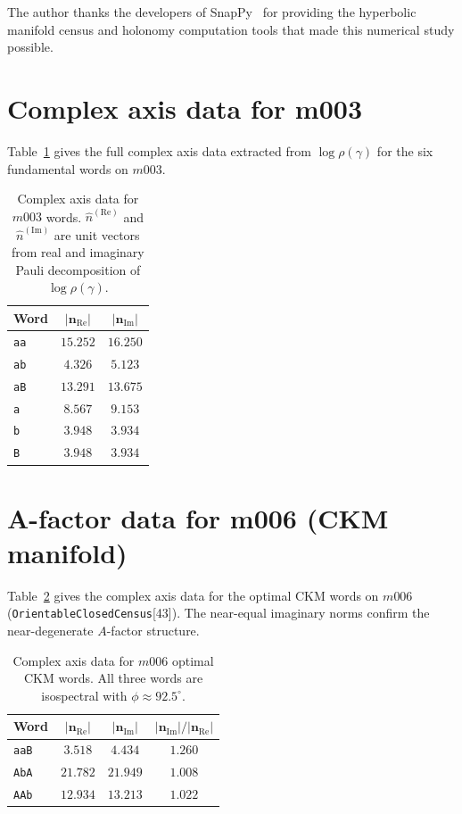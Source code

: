 \documentclass[floatfix,aps,prd,twocolumn,showpacs,superscriptaddress,longbibliography]{revtex4-2}
\begin{document}
\begin{acknowledgments}
The author thanks the developers of SnapPy~\cite{snappy} for
providing the hyperbolic manifold census and holonomy computation
tools that made this numerical study possible.
\end{acknowledgments}

\appendix

\section{Complex axis data for m003}
\label{app:complex_axes}

Table~\ref{tab:complex_axes} gives the full complex axis data
extracted from $\log\rho(\gamma)$ for the six fundamental
words on $m003$.

\begin{table}[h]
\centering
\caption{Complex axis data for $m003$ words.
$\hat{n}^{(\mathrm{Re})}$ and $\hat{n}^{(\mathrm{Im})}$ are
unit vectors from real and imaginary Pauli decomposition of
$\log\rho(\gamma)$.}
\label{tab:complex_axes}
\begin{tabular}{lcc}
\toprule
Word & $|\mathbf{n}_{\mathrm{Re}}|$ & $|\mathbf{n}_{\mathrm{Im}}|$ \\
\midrule
\texttt{aa} & $15.252$ & $16.250$ \\
\texttt{ab} & $4.326$  & $5.123$  \\
\texttt{aB} & $13.291$ & $13.675$ \\
\texttt{a}  & $8.567$  & $9.153$  \\
\texttt{b}  & $3.948$  & $3.934$  \\
\texttt{B}  & $3.948$  & $3.934$  \\
\bottomrule
\end{tabular}
\end{table}

\section{A-factor data for m006 (CKM manifold)}
\label{app:ckm_afactor}

Table~\ref{tab:ckm_complex_axes} gives the complex axis data
for the optimal CKM words on $m006$
(\texttt{OrientableClosedCensus}[43]).
The near-equal imaginary norms confirm the near-degenerate
$A$-factor structure.

\begin{table}[h]
\centering
\caption{Complex axis data for $m006$ optimal CKM words.
All three words are isospectral with $\phi \approx 92.5^\circ$.}
\label{tab:ckm_complex_axes}
\begin{tabular}{lccc}
\toprule
Word & $|\mathbf{n}_{\mathrm{Re}}|$ & $|\mathbf{n}_{\mathrm{Im}}|$
     & $|\mathbf{n}_{\mathrm{Im}}|/|\mathbf{n}_{\mathrm{Re}}|$ \\
\midrule
\texttt{aaB} & $3.518$  & $4.434$ & $1.260$ \\
\texttt{AbA} & $21.782$ & $21.949$ & $1.008$ \\
\texttt{AAb} & $12.934$ & $13.213$ & $1.022$ \\
\bottomrule
\end{tabular}
\end{table}
\end{document}
